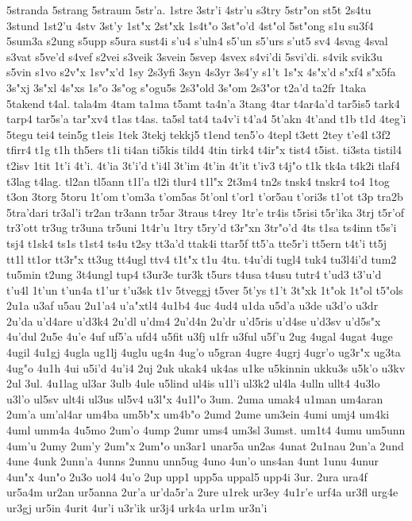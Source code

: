 {5stranda
5strang
5straum
5str'a.
1stre
3str'i
4str'u
s3try
5str"on
st5t
2s4tu
3stund
1st2'u
4stv
3st'y
1st"x
2st"xk
1s4t"o
3st"o'd
4st"ol
5st"ong
s1u
su3f4
5sum3a
s2ung
s5upp
s5ura
sust4i
s'u4
s'uln4
s5'un
s5'urs
s'ut5
sv4
4svag
4sval
s3vat
s5ve'd
s4vef
s2vei
s3veik
3svein
5svep
4svex
s4vi'di
5svi'di.
s4vik
svik3u
s5vin
s1vo
s2v"x
1sv"x'd
1sy
2s3yfi
3syn
4s3yr
3s4'y
s1't
1s"x
4s"x'd
s"xf4
s"x5fa
3s"xj
3s"xl
4s"xs
1s"o
3s"og
s"ogu5s
2s3"old
3s"om
2s3"or
t2a'd
ta2fr
1taka
5takend
t4al.
tala4m
4tam
ta1ma
t5amt
ta4n'a
3tang
4tar
t4ar4a'd
tar5is5
tark4
tarp4
tar5s'a
tar"xv4
t1as
t4as.
ta5sl
tat4
ta4v'i
t4'a4
5t'akn
4t'and
t1b
t1d
4teg'i
5tegu
tei4
tein5g
t1eis
1tek
3tekj
tekkj5
t1end
ten5'o
4tepl
t3ett
2tey
t'e4l
t3f2
tfirr4
t1g
t1h
th5ers
t1i
ti4an
ti5kis
tild4
4tin
tirk4
t4ir"x
tist4
t5ist.
ti3sta
tistil4
t2isv
1tit
1t'i
4t'i.
4t'ia
3t'i'd
t'i4l
3t'im
4t'in
4t'it
t'iv3
t4j"o
t1k
tk4a
t4k2i
tlaf4
t3lag
t4lag.
tl2an
tl5ann
t1l'a
tl2i
tlur4
t1l"x
2t3m4
tn2s
tnsk4
tnskr4
to4
1tog
t3on
3torg
5toru
1t'om
t'om3a
t'om5as
5t'onl
t'or1
t'or5au
t'ori3s
t1'ot
t3p
tra2b
5tra'dari
tr3al'i
tr2an
tr3ann
tr5ar
3traus
t4rey
1tr'e
tr4is
t5risi
t5r'ika
3trj
t5r'of
tr3'ott
tr3ug
tr3una
tr5uni
1t4r'u
1try
t5ry'd
t3r"xn
3tr"o'd
4ts
t1sa
ts4inn
t5s'i
tsj4
t1sk4
ts1s
t1st4
ts4u
t2sy
tt3a'd
ttak4i
ttar5f
tt5'a
tte5r'i
tt5ern
t4t'i
tt5j
tt1l
tt1or
tt3r"x
tt3ug
tt4ugl
ttv4
t1t"x
t1u
4tu.
t4u'di
tugl4
tuk4
tu3l4i'd
tum2
tu5min
t2ung
3t4ungl
tup4
t3ur3e
tur3k
t5urs
t4usa
t4usu
tutr4
t'ud3
t3'u'd
t'u4l
1t'un
t'un4a
t1'ur
t'u3sk
t1v
5tveggj
t5ver
5t'ys
t1't
3t"xk
1t"ok
1t"ol
t5"ols
2u1a
u3af
u5au
2u1'a4
u'a"xtl4
4u1b4
4uc
4ud4
u1da
u5d'a
u3de
u3d'o
u3dr
2u'da
u'd4are
u'd3k4
2u'dl
u'dm4
2u'd4n
2u'dr
u'd5ris
u'd4se
u'd3sv
u'd5s"x
4u'dul
2u5e
4u'e
4uf
uf5'a
ufd4
u5fit
u3fj
u1fr
u3ful
u5f'u
2ug
4ugal
4ugat
4uge
4ugil
4u1gj
4ugla
ug1lj
4uglu
ug4n
4ug'o
u5gran
4ugre
4ugrj
4ugr'o
ug3r"x
ug3ta
4ug"o
4u1h
4ui
u5i'd
4u'i4
2uj
2uk
ukak4
uk4as
u1ke
u5kinnin
ukku3s
u5k'o
u3kv
2ul
3ul.
4u1lag
ul3ar
3ulb
4ule
u5lind
ul4is
u1l'i
ul3k2
ul4la
4ulln
ullt4
4u3lo
u3l'o
ul5sv
ult4i
ul3us
ul5v4
u3l"x
4u1l"o
3um.
2uma
umak4
u1man
um4aran
2um'a
um'al4ar
um4ba
um5b"x
um4b"o
2umd
2ume
um3ein
4umi
umj4
um4ki
4uml
umm4a
4u5mo
2um'o
4ump
2umr
ums4
um3sl
3umst.
um1t4
4umu
um5unn
4um'u
2umy
2um'y
2um"x
2um"o
un3ar1
unar5a
un2as
4unat
2u1nau
2un'a
2und
4une
4unk
2unn'a
4unns
2unnu
unn5ug
4uno
4un'o
uns4an
4unt
1unu
4unur
4un"x
4un"o
2u3o
uol4
4u'o
2up
upp1
upp5a
uppal5
upp4i
3ur.
2ura
ura4f
ur5a4m
ur2an
ur5anna
2ur'a
ur'da5r'a
2ure
u1rek
ur3ey
4u1r'e
urf4a
ur3fl
urg4e
ur3gj
ur5in
4urit
4ur'i
u3r'ik
ur3j4
urk4a
ur1m
ur3n'i
}
